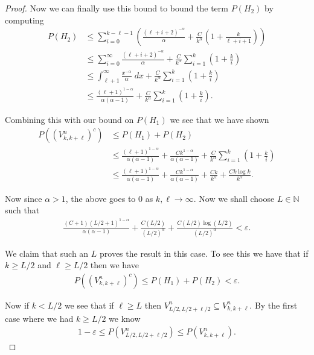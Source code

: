 \documentclass[11pt]{article}
\theoremstyle{definition}
\newcommand{\N}{\mathbb{N}}
\begin{document}
\begin{proof}
    \noindent Now we can finally use this bound to bound the term $P(H_2)$ by computing
    \begin{align*}
        P(H_2) &\leq \sum_{i = 0}^{k-\ell - 1}\left( \frac{(\ell + i+2)^{-\alpha}}{\alpha} + \frac{C}{k^\alpha}\left(1 + \frac{k}{\ell + i+1} \right)\right) \\
        &\leq \sum_{i = 0}^\infty\frac{(\ell + i+2)^{-\alpha}}{\alpha} + \frac{C}{k^\alpha}\sum_{i = 1}^k \left(1 + \frac{k}{i} \right)\\
        &\leq \int_{\ell +1}^\infty \frac{x^{-\alpha}}{\alpha}\;dx + \frac{C}{k^\alpha}\sum_{i = 1}^k \left(1 + \frac{k}{i}\right)\\
        &\leq \frac{(\ell + 1)^{1-\alpha}}{\alpha(\alpha-1)} + \frac{C}{k^\alpha}\sum_{i = 1}^k \left(1 + \frac{k}{i}\right).
    \end{align*}

    \noindent Combining this with our bound on $P(H_1)$ we see that we have shown 
    \begin{align*}
        P((V_{k,k+\ell}^n)^c) &\leq P(H_1) + P(H_2) \\
        &\leq \frac{(\ell + 1)^{1-\alpha}}{\alpha(\alpha-1)} + \frac{Ck^{1-\alpha}}{\alpha(\alpha - 1)} + \frac{C}{k^\alpha}\sum_{i = 1}^k \left(1 + \frac{k}{i} \right)\\
        &\leq \frac{(\ell + 1)^{1-\alpha}}{\alpha(\alpha-1)} + \frac{Ck^{1-\alpha}}{\alpha(\alpha - 1)} + \frac{Ck}{k^\alpha} + \frac{Ck\log k}{k^\alpha}.
    \end{align*}

    \noindent Now since $\alpha > 1$, the above goes to $0$ as $k, \ell \to \infty$. Now we shall choose $L \in \N$ such that
    \begin{align*}
        \frac{(C+1)(L/2 +1)^{1-\alpha}}{\alpha(\alpha-1)}  + \frac{C(L/2)}{(L/2)^\alpha} + \frac{C(L/2)\log (L/2)}{(L/2)^\alpha}  < \varepsilon.
    \end{align*}

    \noindent We claim that such an $L$ proves the result in this case. To see this we have that if $k \geq L/2$ and $\ell \geq L/2$ then we have
    \begin{align*}
        P((V^n_{k,k+\ell})^c) \leq P(H_1) + P(H_2) < \varepsilon.
    \end{align*}

    \noindent Now if $k < L/2$ we see that if $\ell \geq L$ then $V_{L/2, L/2 + \ell/2}^n \subseteq V^n_{k,k+\ell}$. By the first case where we had $k \geq L/2$ we know 
    \begin{align*}
        1 - \varepsilon \leq P(V_{L/2, L/2 + \ell/2}^n) \leq P(V^n_{k,k+\ell}).
    \end{align*}


\end{proof}
\end{document}
